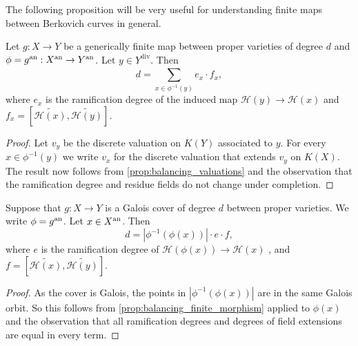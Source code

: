 The following proposition will be very useful for understanding finite maps between Berkovich curves in general. 
\begin{proposition}\label{prop:balancing_finite_morphism}
	Let $g: X \to Y$ be a generically finite map between proper varieties of degree $d$ and $\phi = g\an: X\an \to Y\an$. 
	Let $y \in Y^{\text{div}}$. 
	Then 
	\[
		d = \sum_{x \in \phi^{-1}(y)}^{} e_{x} \cdot  f_{x} 
	,\] 
	where $e_x$ is the ramification degree of the induced map  $\mathcal{H} (y) \to \mathcal{H} (x)$ and $f_x = \left[\widetilde{\mathcal{H} (x)}, \widetilde {\mathcal{H} (y)}\right]$.
\end{proposition}
\begin{proof}
	Let $v_y$ be the discrete valuation on $K(Y)$ associated to $y$. 
	For every $x \in \phi^{-1}(y)$ we write $v_x$ for the discrete valuation that extends $v_y$ on $K(X)$. 
	The result now follows from \cref{prop:balancing_valuations} and the observation that the ramification degree and residue fields do not change under completion. 
\end{proof}

\begin{corollary}\label{cor:balancing_galois_cover}
	Suppose that $g: X \to Y$ is a Galois cover of degree $d$ between proper varieties. 
	We write $\phi = g\an$. 
	Let $x \in X{}^{\text{an}}$. 
	Then \[
		d = |\phi^{-1}(\phi(x))| \cdot e\cdot f
	,\] 
	where $e$ is the ramification degree of $\mathcal{H} (\phi(x)) \to \mathcal{H} (x)$ , and  $f = \left[\widetilde{\mathcal{H} (x)}, \widetilde {\mathcal{H} (y)}\right]$.
\end{corollary}
\begin{proof}
	As the cover is Galois, the points in $|\phi^{-1}(\phi(x))|$ are in the same Galois orbit.
	So this follows from \cref{prop:balancing_finite_morphism} applied to $\phi(x)$ and the observation that all ramification degrees and degrees of field extensions are equal in every term. 
\end{proof}

